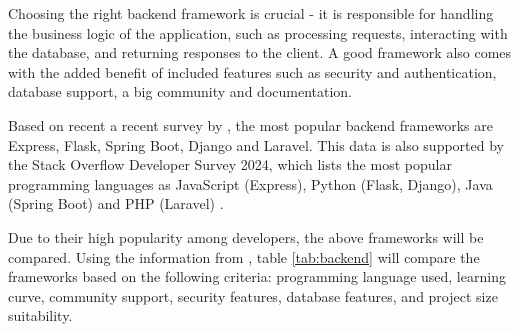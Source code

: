Choosing the right backend framework is crucial - it is responsible for handling the business logic of the application, such as processing requests, interacting with the database, and returning responses to the client. A good framework also comes with the added benefit of included features such as security and authentication, database support, a big community and documentation. 

Based on recent a recent survey by \textcite{statista-webframeworks}, the most popular backend frameworks are Express, Flask, Spring Boot, Django and Laravel. This data is also supported by the Stack Overflow Developer Survey 2024, which lists the most popular programming languages as JavaScript (Express), Python (Flask, Django), Java (Spring Boot) and PHP (Laravel) \parencite{stackoverflow}. 

Due to their high popularity among developers, the above frameworks will be compared. Using the information from \textcite{spring,laravel,express,django}, table \ref{tab:backend} will compare the frameworks based on the following criteria: programming language used, learning curve, community support, security features, database features, and project size suitability.

\begin{table}[h]
    \centering
    \caption{Comparison of backend frameworks}
    \label{tab:backend}
\end{table}

